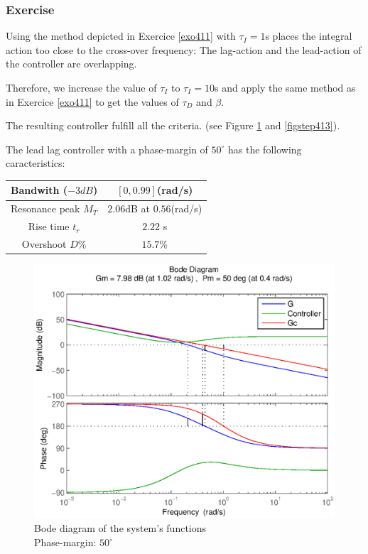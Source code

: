 \subsubsection{Exercise}

Using the method depicted in Exercice \ref{exo411} with $\tau_I = 1$s places the integral action too close to the cross-over frequency: The lag-action and the lead-action of the controller are overlapping.

Therefore, we increase the value of $\tau_I$ to $\tau_I = 10$s and apply the same method as in Exercice \ref{exo411} to get the values of $\tau_D$ and $\beta$.

The resulting controller fulfill all the criteria.
(see Figure \ref{figbode413} and \ref{figstep413}).

The lead lag controller with a phase-margin of $50^{\circ}$ has the following caracteristics:
\begin{center}
\begin{tabular}{|c|c|}
    \hline
    Bandwith ($-3dB$) & $[0,0.99]$(rad/s)\\
    \hline
    Resonance peak $M_T$ & $2.06$dB at $0.56$(rad/s)\\
    \hline
    Rise time $t_r$ & $2.22$ s\\
    \hline
    Overshoot $D$\% & $15.7$\%\\
    \hline
\end{tabular}
\end{center}

\begin{figure}[h!t]
   \includegraphics[width=\columnwidth]{fig/bode413.eps}
    \caption{Bode diagram of the system's functions \\ Phase-margin: $50^{\circ}$} 
    \label{figbode413}
\end{figure}

